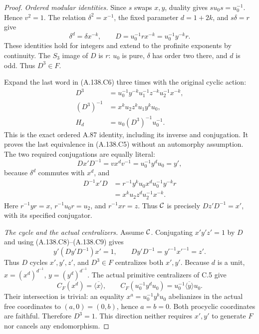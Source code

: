 \begin{proof}
\emph{Ordered modular identities.}
Since \(s\) swaps \(x,y\), duality gives
\(su_0s=u_0^{-1}\). Hence \(v^2=1\).
The relation \(\delta^2=x^{-1}\), the fixed parameter
\(d=1+2k\), and \(s\delta=r\) give
\[
 \delta^d=\delta x^{-k},\qquad
 D=u_0^{-1}r x^{-k}=u_0^{-1}y^{-k}r .
\tag{A.138.C6}
\]
These identities hold for integers and extend to the profinite
exponents by continuity. The \(S_3\) image of \(D\) is \(r\):
\(u_0\) is pure, \(\delta\) has order two there, and \(d\)
is odd. Thus \(D^3\in F\).

Expand the last word in (A.138.C6) three times with the
original cyclic action:
\[
\begin{aligned}
 D^3&=u_0^{-1}y^{-k}u_1^{-1}z^{-k}u_2^{-1}x^{-k},\\
 (D^3)^{-1}&=x^k u_2z^k u_1y^k u_0,\\
 H_d&=u_0(D^3)^{-1}u_0^{-1}.
\end{aligned}
\tag{A.138.C7}
\]
This is the exact ordered A.87 identity, including its inverse
and conjugation. It proves the last equivalence in
(A.138.C5) without an automorphy assumption.
The two required conjugations are equally literal:
\[
 Dx'D^{-1}=v x^dv^{-1}=u_0^{-1}y^du_0=y',
\tag{A.138.C8}
\]
because \(\delta^d\) commutes with \(x^d\), and
\[
\begin{aligned}
 D^{-1}x'D
 &=r^{-1}y^k u_0x^du_0^{-1}y^{-k}r\\
 &=x^k u_2z^du_2^{-1}x^{-k}.
\end{aligned}
\tag{A.138.C9}
\]
Here \(r^{-1}yr=x\), \(r^{-1}u_0r=u_2\), and
\(r^{-1}xr=z\). Thus \({\cal C}\) is precisely
\(Dz'D^{-1}=x'\), with its specified conjugator.

\par\smallskip\noindent
\emph{The cycle and the actual centralizers.}
Assume \({\cal C}\). Conjugating \(x'y'z'=1\) by \(D\)
and using (A.138.C8)--(A.138.C9) gives
\[
 y'(Dy'D^{-1})x'=1,\qquad
 Dy'D^{-1}=y'^{-1}x'^{-1}=z'.
\]
Thus \(D\) cycles \(x',y',z'\), and \(D^3\in F\)
centralizes both \(x',y'\).
Because \(d\) is a unit,
\(x=(x^d)^{d^{-1}}\), \(y=(y^d)^{d^{-1}}\).
The actual primitive centralizers of C.5 give
\[
 C_F(x^d)=\overline{\langle x\rangle},\qquad
 C_F(u_0^{-1}y^du_0)
      =u_0^{-1}\overline{\langle y\rangle}u_0.
\tag{A.138.C10}
\]
Their intersection is trivial: an equality
\(x^a=u_0^{-1}y^bu_0\) abelianizes in the actual free
coordinates to \((a,0)=(0,b)\), hence \(a=b=0\).
Both procyclic coordinates are faithful. Therefore \(D^3=1\).
This direction neither requires \(x',y'\) to generate \(F\)
nor cancels any endomorphism.


\end{proof}
